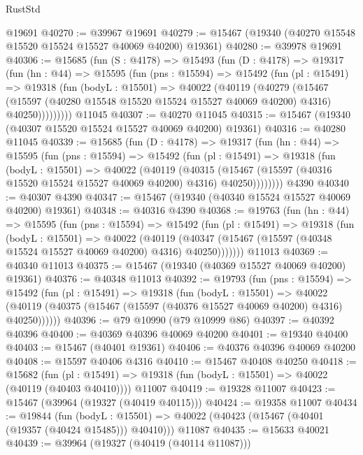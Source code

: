 \begin{lexlean}{RustStd}
\begin{coremodule}
    @19691
@40270 := @39967 @19691
@40279 := @15467 (@19340 (@40270 @15548 @15520 @15524 @15527 @40069 @40200) @19361)
@40280 := @39978 @19691
@40306 := @15685
    (fun (S : @4178) =>
    @15493
      (fun (D : @4178) =>
      @19317
        (fun (hn : @44) =>
        @15595
          (fun (pns : @15594) =>
          @15492
            (fun (pl : @15491) =>
            @19318
              (fun (bodyL : @15501) =>
              @40022
                (@40119
                  (@40279
                    (@15467
                      (@15597 (@40280 @15548 @15520 @15524 @15527 @40069 @40200) @4316)
                      @40250)))))))))
    @11045
@40307 := @40270 @11045
@40315 := @15467 (@19340 (@40307 @15520 @15524 @15527 @40069 @40200) @19361)
@40316 := @40280 @11045
@40339 := @15685
    (fun (D : @4178) =>
    @19317
      (fun (hn : @44) =>
      @15595
        (fun (pns : @15594) =>
        @15492
          (fun (pl : @15491) =>
          @19318
            (fun (bodyL : @15501) =>
            @40022
              (@40119
                (@40315
                  (@15467 (@15597 (@40316 @15520 @15524 @15527 @40069 @40200) @4316) @40250))))))))
    @4390
@40340 := @40307 @4390
@40347 := @15467 (@19340 (@40340 @15524 @15527 @40069 @40200) @19361)
@40348 := @40316 @4390
@40368 := @19763
    (fun (hn : @44) =>
    @15595
      (fun (pns : @15594) =>
      @15492
        (fun (pl : @15491) =>
        @19318
          (fun (bodyL : @15501) =>
          @40022
            (@40119
              (@40347 (@15467 (@15597 (@40348 @15524 @15527 @40069 @40200) @4316) @40250)))))))
    @11013
@40369 := @40340 @11013
@40375 := @15467 (@19340 (@40369 @15527 @40069 @40200) @19361)
@40376 := @40348 @11013
@40392 := @19793
    (fun (pns : @15594) =>
    @15492
      (fun (pl : @15491) =>
      @19318
        (fun (bodyL : @15501) =>
        @40022 (@40119 (@40375 (@15467 (@15597 (@40376 @15527 @40069 @40200) @4316) @40250))))))
@40396 := @79 @10990 (@79 @10999 @86)
@40397 := @40392 @40396
@40400 := @40369 @40396 @40069 @40200
@40401 := @19340 @40400
@40403 := @15467 (@40401 @19361)
@40406 := @40376 @40396 @40069 @40200
@40408 := @15597 @40406 @4316
@40410 := @15467 @40408 @40250
@40418 := @15682
    (fun (pl : @15491) => @19318 (fun (bodyL : @15501) => @40022 (@40119 (@40403 @40410))))
    @11007
@40419 := @19328 @11007
@40423 := @15467 (@39964 (@19327 (@40419 @40115)))
@40424 := @19358 @11007
@40434 := @19844
    (fun (bodyL : @15501) => @40022 (@40423 (@15467 (@40401 (@19357 (@40424 @15485))) @40410)))
    @11087
@40435 := @15633 @40021
@40439 := @39964 (@19327 (@40419 (@40114 @11087)))

\end{coremodule}
\end{lexlean}
